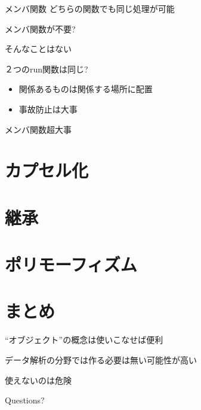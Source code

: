 \documentclass[12pt, xetex, xcolor=pdftex, dvipsnames]{beamer}
\begin{document}
\begin{frame}{メンバ関数}
    どちらの関数でも同じ処理が可能

    \pause メンバ関数が不要?

    \pause \alert{そんなことはない}
\end{frame}
\begin{frame}[fragile]{２つのrun関数は同じ?}
    
    \begin{itemize}
        \item 関係あるものは関係する場所に配置
        \item 事故防止は大事
    \end{itemize}
    \pause
    \alert{メンバ関数超大事}
\end{frame}

\section{カプセル化}

\section{継承}

\section{ポリモーフィズム}

\section{まとめ}
\begin{frame}
    ``オブジェクト''の概念は使いこなせば便利

    データ解析の分野では作る必要は無い可能性が高い

    使えないのは危険
\end{frame}
\begin{frame}[standout]
  Questions?
\end{frame}
\end{document}
